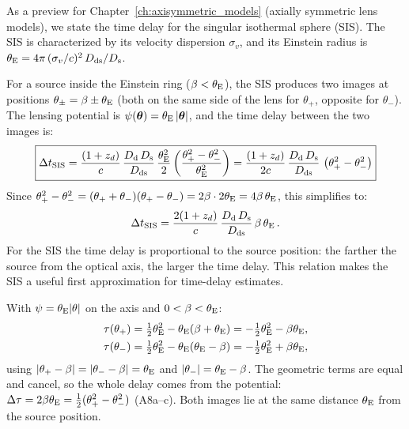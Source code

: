As a preview for Chapter~\ref{ch:axisymmetric_models} (axially symmetric lens models), we state the
time delay for the singular isothermal sphere (SIS).  The SIS
is characterized by its velocity dispersion $\sigma_v$, and its Einstein
radius is $\theta_{\mathrm{E}} = 4\pi\,(\sigma_v/c)^2\,D_{\mathrm{ds}}/D_{\mathrm{s}}$.

For a source inside the Einstein ring ($\beta < \theta_{\mathrm{E}}$), the SIS
produces two images at positions $\theta_\pm = \beta \pm \theta_{\mathrm{E}}$
(both on the same side of the lens for $\theta_+$, opposite for
$\theta_-$).  The lensing potential is
$\psi(\boldsymbol{\theta}) = \theta_{\mathrm{E}}\,|\boldsymbol{\theta}|$, and the time delay between
the two images is:
\begin{equation}
    \boxed{
    \Delta t_{\mathrm{SIS}} = \frac{(1 + z_d)}{c}\,
    \frac{D_{\mathrm{d}}\,D_{\mathrm{s}}}{D_{\mathrm{ds}}}\,
    \frac{\theta_{\mathrm{E}}^2}{2}\left(
    \frac{\theta_+^2 - \theta_-^2}{\theta_{\mathrm{E}}^2}
    \right)
    = \frac{(1 + z_d)}{2c}\,
    \frac{D_{\mathrm{d}}\,D_{\mathrm{s}}}{D_{\mathrm{ds}}}\,
    \left(\theta_+^2 - \theta_-^2\right)
    }
    \label{eq:time_delay_SIS}
\end{equation}
Since $\theta_+^2 - \theta_-^2 = (\theta_+ + \theta_-)(\theta_+ - \theta_-)
= 2\beta \cdot 2\theta_{\mathrm{E}} = 4\beta\,\theta_{\mathrm{E}}$, this simplifies to:
\begin{equation}
    \Delta t_{\mathrm{SIS}} = \frac{2(1 + z_d)}{c}\,
    \frac{D_{\mathrm{d}}\,D_{\mathrm{s}}}{D_{\mathrm{ds}}}\, \beta\,\theta_{\mathrm{E}} \,.
    \label{eq:time_delay_SIS_simple}
\end{equation}
For the SIS the time delay is proportional to the source position:
the farther the source from the optical axis, the larger the time delay.
This relation makes the SIS a useful first approximation for
time-delay estimates.

\begin{derivation}
With $\psi = \theta_{\mathrm{E}}|\theta|$ on the axis and $0<\beta<\theta_{\mathrm{E}}$:
\begin{align*}
  \tau(\theta_+) &= \tfrac{1}{2}\theta_{\mathrm{E}}^2-\theta_{\mathrm{E}}(\beta+\theta_{\mathrm{E}}) = -\tfrac{1}{2}\theta_{\mathrm{E}}^2-\beta\theta_{\mathrm{E}},\\
  \tau(\theta_-) &= \tfrac{1}{2}\theta_{\mathrm{E}}^2-\theta_{\mathrm{E}}(\theta_{\mathrm{E}}-\beta) = -\tfrac{1}{2}\theta_{\mathrm{E}}^2+\beta\theta_{\mathrm{E}},
\end{align*}
using $|\theta_+-\beta| = |\theta_--\beta| = \theta_{\mathrm{E}}$ and $|\theta_-| = \theta_{\mathrm{E}}-\beta$.
The geometric terms are equal and cancel, so the whole delay comes from the
potential: $\Delta\tau = 2\beta\theta_{\mathrm{E}} = \tfrac{1}{2}(\theta_+^2-\theta_-^2)$
(A8a--c).  Both images lie at the same distance $\theta_{\mathrm{E}}$ from the source
position.
\end{derivation}

